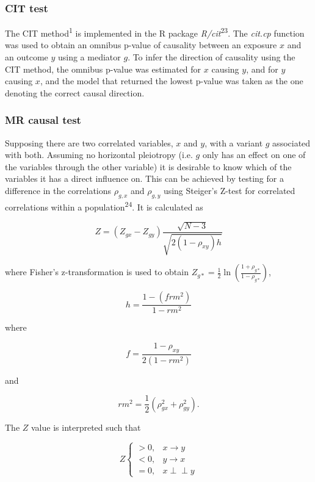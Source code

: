 \documentclass[]{article}
\begin{document}
\subsubsection{CIT test}\label{cit-test}

The CIT method\textsuperscript{1} is implemented in the R package
\emph{R/cit}\textsuperscript{23}. The \emph{cit.cp} function was used to
obtain an omnibus p-value of causality between an exposure \(x\) and an
outcome \(y\) using a mediator \(g\). To infer the direction of
causality using the CIT method, the omnibus p-value was estimated for
\(x\) causing \(y\), and for \(y\) causing \(x\), and the model that
returned the lowest p-value was taken as the one denoting the correct
causal direction.

\subsubsection{MR causal test}\label{mr-causal-test}

Supposing there are two correlated variables, \(x\) and \(y\), with a
variant \(g\) associated with both. Assuming no horizontal pleiotropy
(i.e. \(g\) only has an effect on one of the variables through the other
variable) it is desirable to know which of the variables it has a direct
influence on. This can be achieved by testing for a difference in the
correlations \(\rho_{g, x}\) and \(\rho_{g, y}\) using Steiger's Z-test
for correlated correlations within a population\textsuperscript{24}. It
is calculated as

\[
Z = (Z_{gx} - Z_{gy}) \frac{\sqrt{N-3}}{\sqrt{2(1-\rho_{xy})h}}
\]

where Fisher's z-transformation is used to obtain
\(Z_{g*} = \frac{1}{2} \ln \left ( \frac{1+\rho_{g*}}{1-\rho_{g*}} \right )\),

\[
h = \frac{1 - (frm^2)} {1 - rm^2}
\]

where

\[
f = \frac{1 - \rho_{xy}}{2(1 - rm^2)}
\]

and

\[
rm^2 = \frac{1}{2}(\rho_{gx}^2 + \rho_{gy}^2).
\]

The \(Z\) value is interpreted such that

\[
Z \left\{
\begin{array}{ll}
> 0, & x \to y\\
< 0, & y \to x\\
= 0, & x \perp\!\!\!\perp y 
\end{array} \right.
\]
\end{document}
